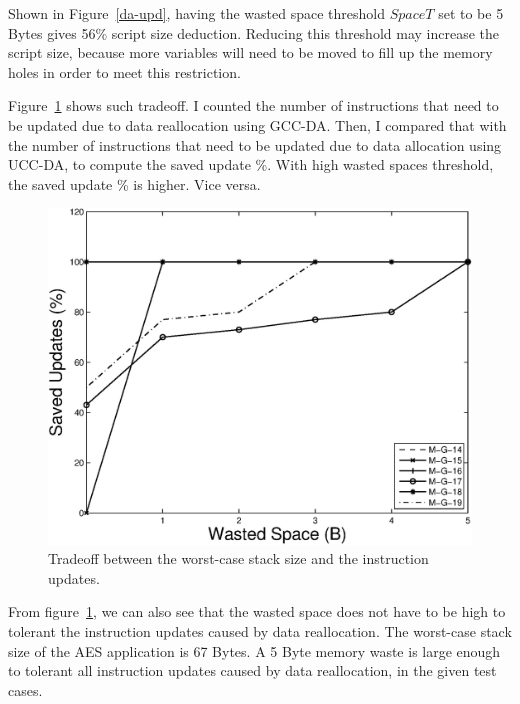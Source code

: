 Shown in Figure~\ref{da-upd}, having the wasted space threshold $SpaceT$ set to be 5 Bytes gives 56\% script 
size deduction. Reducing this threshold may increase the script size, because more variables will
need to be moved to fill up the memory holes in order to meet this restriction.

Figure~\ref{da-tradeoff} shows such tradeoff.  I counted the number of instructions that need
to be updated due to data reallocation using GCC-DA.
Then, I compared that with the number of instructions that need to be updated due
to data allocation using UCC-DA, to compute the saved update \%.
With high wasted spaces threshold, the saved update \% is higher. 
Vice versa.

\begin{figure}[htbp]
\centering
\includegraphics[scale=0.6]{./figures/spacetradeoff.eps}
\caption{Tradeoff between the worst-case stack size and the instruction updates.}
\label{da-tradeoff}
\vspace{-0.1in}
\end{figure}

From figure~\ref{da-tradeoff}, we can also see that the wasted space does not have to be high to
tolerant the instruction updates caused by data reallocation.
The worst-case stack size of the AES application is 67 Bytes. A 5 Byte memory waste
is large enough to tolerant all instruction updates caused by data reallocation, in the given
test cases.

